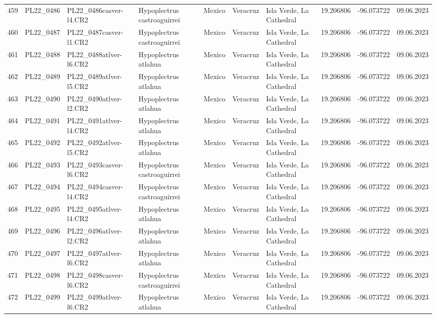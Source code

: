 \begin{table}[ht]
\begin{tabular}{rlllllllll}
  459 & PL22\_0486 & PL22\_0486casver-l4.CR2 & Hypoplectrus castroaguirrei & Mexico & Veracruz & Isla Verde, La Cathedral & 19.206806 & -96.073722 & 09.06.2023 \\ 
  460 & PL22\_0487 & PL22\_0487casver-l1.CR2 & Hypoplectrus castroaguirrei & Mexico & Veracruz & Isla Verde, La Cathedral & 19.206806 & -96.073722 & 09.06.2023 \\ 
  461 & PL22\_0488 & PL22\_0488atlver-l6.CR2 & Hypoplectrus atlahua & Mexico & Veracruz & Isla Verde, La Cathedral & 19.206806 & -96.073722 & 09.06.2023 \\ 
  462 & PL22\_0489 & PL22\_0489atlver-l5.CR2 & Hypoplectrus atlahua & Mexico & Veracruz & Isla Verde, La Cathedral & 19.206806 & -96.073722 & 09.06.2023 \\ 
  463 & PL22\_0490 & PL22\_0490atlver-l2.CR2 & Hypoplectrus atlahua & Mexico & Veracruz & Isla Verde, La Cathedral & 19.206806 & -96.073722 & 09.06.2023 \\ 
  464 & PL22\_0491 & PL22\_0491atlver-l4.CR2 & Hypoplectrus atlahua & Mexico & Veracruz & Isla Verde, La Cathedral & 19.206806 & -96.073722 & 09.06.2023 \\ 
  465 & PL22\_0492 & PL22\_0492atlver-l5.CR2 & Hypoplectrus atlahua & Mexico & Veracruz & Isla Verde, La Cathedral & 19.206806 & -96.073722 & 09.06.2023 \\ 
  466 & PL22\_0493 & PL22\_0493casver-l6.CR2 & Hypoplectrus castroaguirrei & Mexico & Veracruz & Isla Verde, La Cathedral & 19.206806 & -96.073722 & 09.06.2023 \\ 
  467 & PL22\_0494 & PL22\_0494casver-l4.CR2 & Hypoplectrus castroaguirrei & Mexico & Veracruz & Isla Verde, La Cathedral & 19.206806 & -96.073722 & 09.06.2023 \\ 
  468 & PL22\_0495 & PL22\_0495atlver-l4.CR2 & Hypoplectrus atlahua & Mexico & Veracruz & Isla Verde, La Cathedral & 19.206806 & -96.073722 & 09.06.2023 \\ 
  469 & PL22\_0496 & PL22\_0496atlver-l2.CR2 & Hypoplectrus atlahua & Mexico & Veracruz & Isla Verde, La Cathedral & 19.206806 & -96.073722 & 09.06.2023 \\ 
  470 & PL22\_0497 & PL22\_0497atlver-l6.CR2 & Hypoplectrus atlahua & Mexico & Veracruz & Isla Verde, La Cathedral & 19.206806 & -96.073722 & 09.06.2023 \\ 
  471 & PL22\_0498 & PL22\_0498casver-l6.CR2 & Hypoplectrus castroaguirrei & Mexico & Veracruz & Isla Verde, La Cathedral & 19.206806 & -96.073722 & 09.06.2023 \\ 
  472 & PL22\_0499 & PL22\_0499atlver-l6.CR2 & Hypoplectrus atlahua & Mexico & Veracruz & Isla Verde, La Cathedral & 19.206806 & -96.073722 & 09.06.2023 \\ 

\end{tabular}
\end{table}
